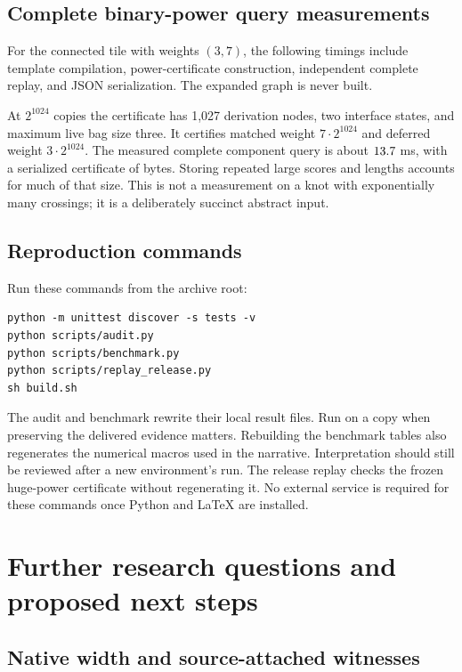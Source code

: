 \documentclass[11pt,a4paper]{article}
\theoremstyle{definition}
\theoremstyle{remark}
\begin{document}
\subsection{Complete binary-power query measurements}
For the connected tile with weights $(3,7)$, the following timings include
template compilation, power-certificate construction, independent complete
replay, and JSON serialization. The expanded graph is never built.
\begin{center}\small

\end{center}

At $2^{1024}$ copies the certificate has 1,027 derivation nodes, two
interface states, and maximum live bag size three. It certifies matched
weight $7\cdot2^{1024}$ and deferred weight $3\cdot2^{1024}$. The measured
complete component query is about $13.7$ ms, with a serialized certificate
of \HugeBytes{} bytes. Storing repeated large scores and lengths accounts for
much of that size. This is not a measurement on a knot with exponentially
many crossings; it is a deliberately succinct abstract input.

\subsection{Reproduction commands}
Run these commands from the archive root:
\begin{lstlisting}
python -m unittest discover -s tests -v
python scripts/audit.py
python scripts/benchmark.py
python scripts/replay_release.py
sh build.sh
\end{lstlisting}
The audit and benchmark rewrite their local result files. Run on a copy
when preserving the delivered evidence matters. Rebuilding the benchmark
tables also regenerates the numerical macros used in the narrative.
Interpretation should still be reviewed after a new environment's run. The release replay checks the frozen huge-power
certificate without regenerating it. No external service is required for
these commands once Python and LaTeX are installed.

\section{Further research questions and proposed next steps}
\label{sec:future}

\subsection{Native width and source-attached witnesses}
\end{document}
